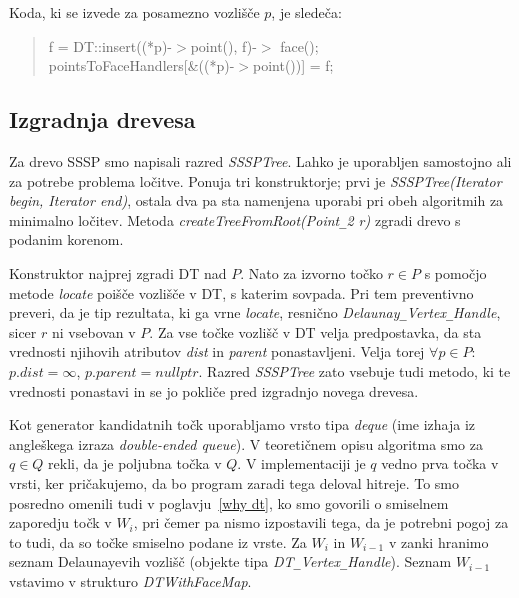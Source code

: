 \documentclass[a4paper, 12pt]{book}
\newcommand{\U}{\texttt{\_}}
\begin{document}
Koda, ki se izvede za posamezno vozlišče $p$, je sledeča:

\begin{quote}
f = DT::insert((*p)-$>$point(), f)-$>$ face();\\
pointsToFaceHandlers[\&((*p)-$>$point())] = f;
\end{quote}

\subsection{Izgradnja drevesa} 

Za drevo SSSP smo napisali razred \textit{SSSPTree}. Lahko je uporabljen samostojno ali za potrebe problema ločitve. Ponuja tri konstruktorje; prvi je \textit{SSSP\-Tree(Iterator begin, Iterator end)}, ostala dva pa sta namenjena uporabi pri obeh algoritmih za minimalno ločitev. Metoda \textit{createTreeFromRoot\-(Point\U 2 r)} zgradi drevo s podanim korenom. 

Konstruktor najprej zgradi DT nad $P$. Nato za izvorno točko $r\in P$ s pomočjo metode \textit{locate} poišče vozlišče v DT, s katerim sovpada. Pri tem preventivno preveri, da je tip rezultata, ki ga vrne \textit{locate}, resnično \textit{Delaunay\U Ver\-tex\U Handle}, sicer $r$ ni vsebovan v $P$. Za vse točke vozlišč v DT velja predpostavka, da sta vrednosti njihovih atributov \textit{dist} in \textit{parent} ponastavljeni. Velja torej $\forall p\in P:$ $p.dist = \infty$,  $p.parent = nullptr$. Razred \textit{SSSPTree} zato vsebuje tudi metodo, ki te vrednosti ponastavi in se jo pokliče pred izgradnjo novega drevesa.

Kot generator kandidatnih točk uporabljamo vrsto tipa \textit{deque} (ime izhaja iz angleškega izraza \textit{double-ended queue}). V teoretičnem opisu algoritma smo za $q\in Q$ rekli, da je poljubna točka v $Q$. V implementaciji je $q$ vedno prva točka v vrsti, ker pričakujemo, da bo program zaradi tega deloval hitreje. To smo posredno omenili tudi v poglavju~\ref{why dt}, ko smo govorili o smiselnem zaporedju točk v $W_i$, pri čemer pa nismo izpostavili tega, da je potrebni pogoj za to tudi, da so točke smiselno podane iz vrste. Za $W_i$ in $W_{i-1}$ v zanki hranimo seznam Delaunayevih vozlišč (objekte tipa \textit{DT\U Vertex\U Handle}). Seznam $W_{i-1}$ vstavimo v strukturo \textit{DTWithFaceMap}. 
\end{document}
